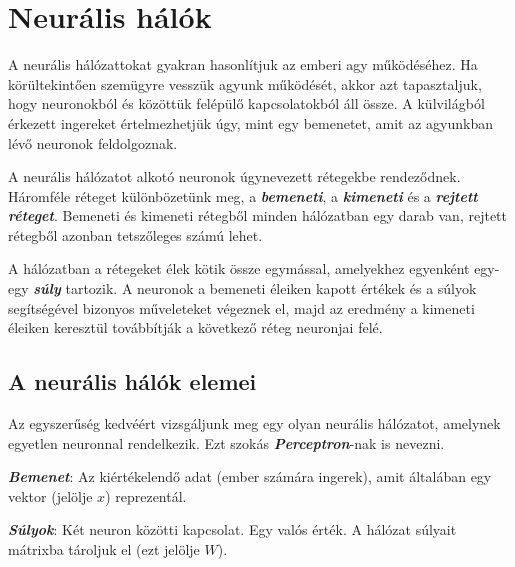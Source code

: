 




\section{Neurális hálók}

A neurális hálózattokat \cite{neuralis77} gyakran hasonlítjuk az emberi agy működéséhez. Ha körültekintően szemügyre vesszük agyunk működését, akkor azt tapasztaljuk, hogy neuronokból és közöttük felépülő kapcsolatokból áll össze. A külvilágból érkezett ingereket értelmezhetjük úgy, mint egy bemenetet, amit az agyunkban lévő neuronok feldolgoznak.

A neurális hálózatot alkotó neuronok úgynevezett rétegekbe rendeződnek. Háromféle réteget különbözetünk meg, a \textbf{\textit{bemeneti}}, a \textbf{\textit{kimeneti}} és a \textbf{\textit{rejtett réteget}}. Bemeneti és kimeneti rétegből minden hálózatban egy darab van, rejtett rétegből azonban tetszőleges számú lehet.

A hálózatban a rétegeket élek kötik össze egymással, amelyekhez egyenként egy-egy \textbf{\textit{súly}} tartozik. A neuronok a bemeneti éleiken kapott értékek és a súlyok segítségével bizonyos műveleteket végeznek el, majd az eredmény a kimeneti éleiken keresztül továbbítják a következő réteg neuronjai felé.

\subsection{A neurális hálók elemei}

Az egyszerűség kedvéért vizsgáljunk meg egy olyan neurális hálózatot, amelynek egyetlen neuronnal rendelkezik. Ezt szokás \textbf{\textit{Perceptron}}-nak is nevezni.

\textbf{\textit{Bemenet}}: Az kiértékelendő adat (ember számára ingerek), amit általában egy vektor (jelölje $x$) reprezentál.

\textit{\textbf{Súlyok}}: Két neuron közötti kapcsolat. Egy valós érték. A hálózat súlyait mátrixba tároljuk el (ezt jelölje $W$).

